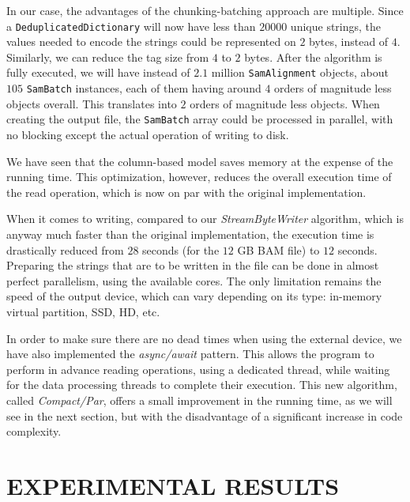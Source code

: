 \documentclass[a4paper,twoside]{article}
\begin{document}
In our case, the advantages of the chunking-batching approach are multiple.
Since a {\texttt{DeduplicatedDictionary}} will now have less than $20000$ unique strings, the values needed to encode the strings could be represented on $2$ bytes, instead of $4$.
Similarly, we can reduce the tag size from $4$ to $2$ bytes.
After the algorithm is fully executed,  we will have instead of $2.1$ million {\texttt{SamAlignment}} objects, about $105$ {\texttt{SamBatch}} instances, each of them having around $4$ orders of magnitude less objects overall.
This translates into $2$ orders of magnitude less objects.
When creating the output file, the {\texttt{SamBatch}} array could be processed in parallel, with no blocking except the actual operation of writing to disk.

We have seen that the column-based model saves memory at the expense of the running time.
This optimization, however, reduces the overall execution time of the read operation, which is now on par with the original implementation.

When it comes to writing, compared to our {\textit{StreamByteWriter} } algorithm, which is anyway much faster than the original implementation, the execution time is drastically reduced from $28$ seconds (for the $12$ GB BAM file) to $12$ seconds.
Preparing the strings that are to be written in the file can be done in almost perfect parallelism, using the available cores.
The only limitation remains the speed of the output device, which can vary depending on its type: in-memory virtual partition, SSD, HD, etc.

In order to make sure there are no dead times when using the external device, 
we have also implemented the {\textit{async/await}} pattern.
This allows the program to perform in advance reading operations, using a dedicated thread, while waiting for the data processing threads to complete their execution.
This new algorithm, called {\textit{Compact/Par}}, offers a small improvement in the running time, as we will see in the next section, but with the disadvantage of a significant increase in code complexity.




\section{\uppercase{Experimental Results}}
\label{sec:results}
\end{document}
